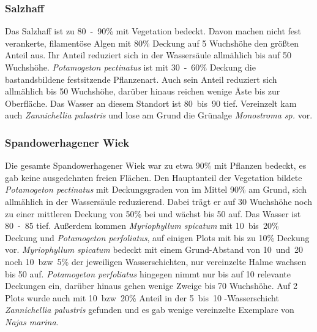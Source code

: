 \subsubsection{Salzhaff}

Das Salzhaff ist zu \unit{80-90}{\%} mit Vegetation bedeckt. Davon machen nicht fest verankerte, filamentöse Algen mit \unit{80}{\%} Deckung auf \unit{5}{\centi\metre} Wuchshöhe den größten Anteil aus. Ihr Anteil reduziert sich in der Wassersäule allmählich bis auf \unit{50}{\centi\metre} Wuchshöhe. \textit{Potamogeton pectinatus} ist mit \unit{30-60}{\%} Deckung die bastandsbildene festsitzende Pflanzenart. Auch sein Anteil reduziert sich allmählich bis \unit{50}{\centi\metre} Wuchshöhe, darüber hinaus reichen wenige Äste bis zur Oberfläche. Das Wasser an diesem Standort ist \unit{80 bis 90}{\centi\metre} tief. Vereinzelt kam auch \textit{Zannichellia palustris} und lose am Grund die Grünalge \textit{Monostroma sp.} vor.

\subsubsection{Spandowerhagener Wiek}

Die gesamte Spandowerhagener Wiek war zu etwa \unit{90}{\%} mit Pflanzen bedeckt, es gab keine ausgedehnten freien Flächen. Den Hauptanteil der Vegetation bildete \textit{Potamogeton pectinatus} mit Deckungsgraden von im Mittel \unit{90}{\%} am Grund, sich allmählich in der Wassersäule reduzierend. Dabei trägt er auf \unit{30}{\centi\metre} Wuchshöhe noch zu einer mittleren Deckung von \unit{50}{\%} bei und wächst bis \unit{50}{\centi\metre} auf. Das Wasser ist \unit{80-85}{\centi\metre} tief. Außerdem kommen \textit{Myriophyllum spicatum} mit \unit{10 bis 20}{\%} Deckung und \textit{Potamogeton perfoliatus}, auf einigen Plots mit bis zu \unit{10}{\%} Deckung vor. \textit{Myriophyllum spicatum} bedeckt mit einem Grund-Abstand von \unit{10 und 20}{\centi\metre} noch \unit{10 bzw. 5}{\%} der jeweiligen Wasserschichten, nur vereinzelte Halme wachsen bis \unit{50}{\centi\metre} auf. \textit{Potamogeton perfoliatus} hingegen nimmt nur bis auf \unit{10}{\centi\metre} relevante Deckungen ein, darüber hinaus gehen wenige Zweige bis \unit{70}{\centi\metre} Wuchshöhe. Auf 2 Plots wurde auch mit \unit{10 bzw. 20}{\%} Anteil in der \unit{5 bis 10}{\centi\metre} -Wasserschicht \textit{Zannichellia palustris} gefunden und es gab wenige vereinzelte Exemplare von \textit{Najas marina}.





